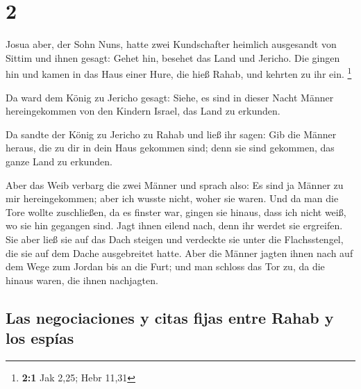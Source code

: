 \hypertarget{section-1}{%
\section{2}\label{section-1}}

 Josua aber, der Sohn Nuns, hatte zwei Kundschafter
heimlich ausgesandt von Sittim und ihnen gesagt: Gehet hin, besehet das
Land und Jericho. Die gingen hin und kamen in das Haus einer Hure, die
hieß Rahab, und kehrten zu ihr ein. \footnote{\textbf{2:1} Jak 2,25;
  Hebr 11,31}

 Da ward dem König zu Jericho gesagt: Siehe, es sind in
dieser Nacht Männer hereingekommen von den Kindern Israel, das Land zu
erkunden.

 Da sandte der König zu Jericho zu Rahab und ließ ihr
sagen: Gib die Männer heraus, die zu dir in dein Haus gekommen sind;
denn sie sind gekommen, das ganze Land zu erkunden.

 Aber das Weib verbarg die zwei Männer und sprach also: Es
sind ja Männer zu mir hereingekommen; aber ich wusste nicht, woher sie
waren.  Und da man die Tore wollte zuschließen, da es
finster war, gingen sie hinaus, dass ich nicht weiß, wo sie hin gegangen
sind. Jagt ihnen eilend nach, denn ihr werdet sie ergreifen.
 Sie aber ließ sie auf das Dach steigen und verdeckte sie
unter die Flachsstengel, die sie auf dem Dache ausgebreitet hatte.
 Aber die Männer jagten ihnen nach auf dem Wege zum Jordan
bis an die Furt; und man schloss das Tor zu, da die hinaus waren, die
ihnen nachjagten.

\hypertarget{las-negociaciones-y-citas-fijas-entre-rahab-y-los-espuxedas}{%
\subsection{Las negociaciones y citas fijas entre Rahab y los
espías}\label{las-negociaciones-y-citas-fijas-entre-rahab-y-los-espuxedas}}

